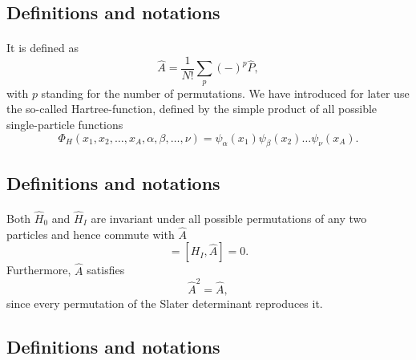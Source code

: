 \documentclass[%
twoside,                 %
final,                   %
10pt]{article}
\begin{document}
\subsection{Definitions and notations}

\paragraph{}
It is defined as
\begin{equation}
  \hat{A} = \frac{1}{N!}\sum_{p} (-)^p\hat{P},
\label{antiSymmetryOperator}
\end{equation}
with $p$ standing for the number of permutations. We have introduced for later use the so-called
Hartree-function, defined by the simple product of all possible single-particle functions
\[
  \Phi_H(x_1,x_2,\dots,x_A,\alpha,\beta,\dots,\nu) =
  \psi_{\alpha}(x_1)
    \psi_{\beta}(x_2)\dots\psi_{\nu}(x_A).
\]



\subsection{Definitions and notations}

\paragraph{}
Both $\hat{H}_0$ and $\hat{H}_I$ are invariant under all possible permutations of any two particles
and hence commute with $\hat{A}$
\begin{equation}
  [H_0,\hat{A}] = [H_I,\hat{A}] = 0. \label{commutionAntiSym}
\end{equation}
Furthermore, $\hat{A}$ satisfies
\begin{equation}
  \hat{A}^2 = \hat{A},  \label{AntiSymSquared}
\end{equation}
since every permutation of the Slater
determinant reproduces it.



\subsection{Definitions and notations}

\end{document}
